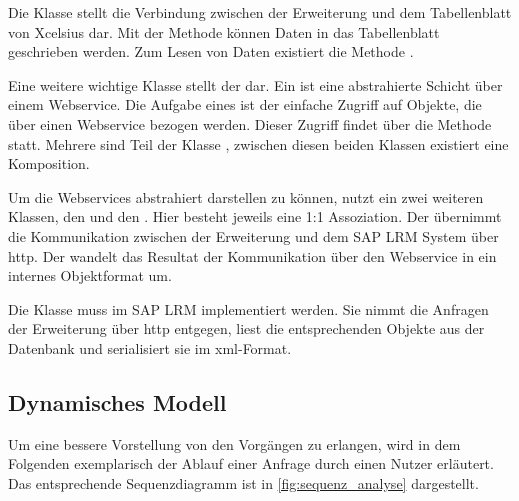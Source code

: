 \begin{onehalfspacing}
Die Klasse  stellt die Verbindung zwischen der Erweiterung und dem Tabellenblatt von \gls{Xcelsius} dar. Mit der Methode  können Daten in das Tabellenblatt geschrieben werden. Zum Lesen von Daten existiert die Methode .

Eine weitere wichtige Klasse stellt der  dar. Ein  ist eine abstrahierte Schicht über einem Webservice. Die Aufgabe eines  ist der einfache Zugriff auf Objekte, die über einen Webservice bezogen werden. Dieser Zugriff findet über die Methode  statt. Mehrere  sind Teil der Klasse , zwischen diesen beiden Klassen existiert eine Komposition.

Um die Webservices abstrahiert darstellen zu können, nutzt ein  zwei weiteren Klassen, den  und den . Hier besteht jeweils eine 1:1 Assoziation. Der  übernimmt die Kommunikation zwischen der Erweiterung und dem SAP LRM System über \gls{http}. Der  wandelt das Resultat der Kommunikation über den Webservice in ein internes Objektformat um.

Die Klasse  muss im SAP LRM implementiert werden. Sie nimmt die Anfragen der Erweiterung über \gls{http} entgegen, liest die entsprechenden Objekte aus der Datenbank und serialisiert sie im \gls{xml}-Format.

\subsection{Dynamisches Modell}
Um eine bessere Vorstellung von den Vorgängen zu erlangen, wird in dem Folgenden exemplarisch der Ablauf einer Anfrage durch einen Nutzer erläutert. Das entsprechende Sequenzdiagramm ist in \vref{fig:sequenz_analyse} dargestellt.


\end{onehalfspacing}

